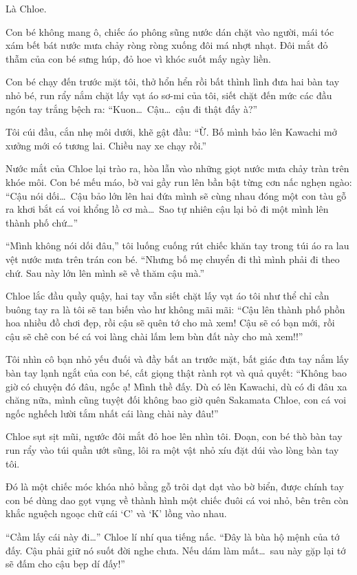 \documentclass[../main.tex]{subfiles}
\begin{document}
Là Chloe.

Con bé không mang ô, chiếc áo phông sũng nước dán chặt vào người, mái tóc xám bết bát nước mưa chảy ròng ròng xuống đôi má nhợt nhạt. Đôi mắt đỏ thẫm của con bé sưng húp, đỏ hoe vì khóc suốt mấy ngày liền.

Con bé chạy đến trước mặt tôi, thở hổn hển rồi bất thình lình đưa hai bàn tay nhỏ bé, run rẩy nắm chặt lấy vạt áo sơ-mi của tôi, siết chặt đến mức các đầu ngón tay trắng bệch ra: ``Kuon\dots\ Cậu\dots\ cậu đi thật đấy à?''

Tôi cúi đầu, cắn nhẹ môi dưới, khẽ gật đầu: ``Ừ. Bố mình bảo lên Kawachi mở xưởng mới có tương lai. Chiều nay xe chạy rồi.''

Nước mắt của Chloe lại trào ra, hòa lẫn vào những giọt nước mưa chảy tràn trên khóe môi. Con bé mếu máo, bờ vai gầy run lên bần bật từng cơn nấc nghẹn ngào: ``Cậu nói dối\dots\ Cậu bảo lớn lên hai đứa mình sẽ cùng nhau đóng một con tàu gỗ ra khơi bắt cá voi khổng lồ cơ mà\dots\ Sao tự nhiên cậu lại bỏ đi một mình lên thành phố chứ\dots''

``Mình không nói dối đâu,'' tôi luống cuống rút chiếc khăn tay trong túi áo ra lau vệt nước mưa trên trán con bé. ``Nhưng bố mẹ chuyển đi thì mình phải đi theo chứ. Sau này lớn lên mình sẽ về thăm cậu mà.''

Chloe lắc đầu quầy quậy, hai tay vẫn siết chặt lấy vạt áo tôi như thể chỉ cần buông tay ra là tôi sẽ tan biến vào hư không mãi mãi: ``Cậu lên thành phố phồn hoa nhiều đồ chơi đẹp, rồi cậu sẽ quên tớ cho mà xem! Cậu sẽ có bạn mới, rồi cậu sẽ chê con bé cá voi làng chài lấm lem bùn đất này cho mà xem!!''

Tôi nhìn cô bạn nhỏ yếu đuối và đầy bất an trước mặt, bất giác đưa tay nắm lấy bàn tay lạnh ngắt của con bé, cất giọng thật rành rọt và quả quyết: ``Không bao giờ có chuyện đó đâu, ngốc ạ! Mình thề đấy. Dù có lên Kawachi, dù có đi đâu xa chăng nữa, mình cũng tuyệt đối không bao giờ quên Sakamata Chloe, con cá voi ngốc nghếch lười tắm nhất cái làng chài này đâu!''

Chloe sụt sịt mũi, ngước đôi mắt đỏ hoe lên nhìn tôi. Đoạn, con bé thò bàn tay run rẩy vào túi quần ướt sũng, lôi ra một vật nhỏ xíu đặt dúi vào lòng bàn tay tôi.

Đó là một chiếc móc khóa nhỏ bằng gỗ trôi dạt dạt vào bờ biển, được chính tay con bé dùng dao gọt vụng về thành hình một chiếc đuôi cá voi nhỏ, bên trên còn khắc nguệch ngoạc chữ cái `C' và `K' lồng vào nhau.

``Cầm lấy cái này đi\dots'' Chloe lí nhí qua tiếng nấc. ``Đây là bùa hộ mệnh của tớ đấy. Cậu phải giữ nó suốt đời nghe chưa. Nếu dám làm mất\dots\ sau này gặp lại tớ sẽ đấm cho cậu bẹp dí đấy!''
\end{document}
